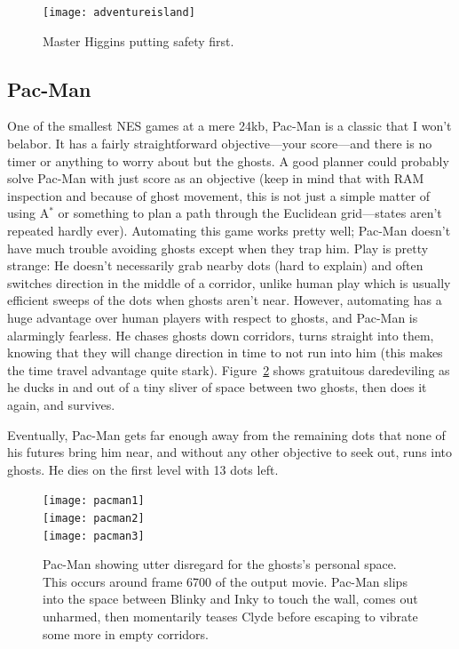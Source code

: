 \documentclass[twocolumn]{article}
\begin{document}
\begin{figure}[ht]
\begin{center}
\texttt{[image: adventureisland]}
\end{center}\vspace{-0.1in}
\caption{Master Higgins putting safety first.}
\label{fig:adventureisland}
\end{figure}

\subsection{Pac-Man}

One of the smallest NES games at a mere 24kb, Pac-Man is a classic
that I won't belabor. It has a fairly straightforward objective---your
score---and there is no timer or anything to worry about but the
ghosts. A good planner could probably solve Pac-Man with just score as
an objective (keep in mind that with RAM inspection and because of
ghost movement, this is not just a simple matter of using A$^{*}$ or
something to plan a path through the Euclidean grid---states aren't
repeated hardly ever). Automating this game works pretty well; Pac-Man
doesn't have much trouble avoiding ghosts except when they trap him.
Play is pretty strange: He doesn't necessarily grab nearby dots (hard
to explain) and often switches direction in the middle of a corridor,
unlike human play which is usually efficient sweeps of the dots when
ghosts aren't near. However, automating has a huge advantage over
human players with respect to ghosts, and Pac-Man is alarmingly
fearless. He chases ghosts down corridors, turns straight into them,
knowing that they will change direction in time to not run into him
(this makes the time travel advantage quite stark).
Figure~\ref{fig:pacman} shows gratuitous daredeviling as he ducks in
and out of a tiny sliver of space between two ghosts, then does it
again, and survives.

Eventually, Pac-Man gets far enough away from the remaining dots that
none of his futures bring him near, and without any other objective
to seek out, runs into ghosts. He dies on the first level with 13 dots
left.

\begin{figure}[ht]
\begin{center}
\texttt{[image: pacman1]} \\[0.3em]
\texttt{[image: pacman2]} \\[0.3em]
\texttt{[image: pacman3]}
\end{center}\vspace{-0.1in}
\caption{Pac-Man showing utter disregard for the ghosts's personal
  space. This occurs around frame 6700 of the output movie. Pac-Man
  slips into the space between Blinky and Inky to touch the wall,
  comes out unharmed, then momentarily teases Clyde before escaping
  to vibrate some more in empty corridors.}
\label{fig:pacman}
\end{figure}
\end{document}
